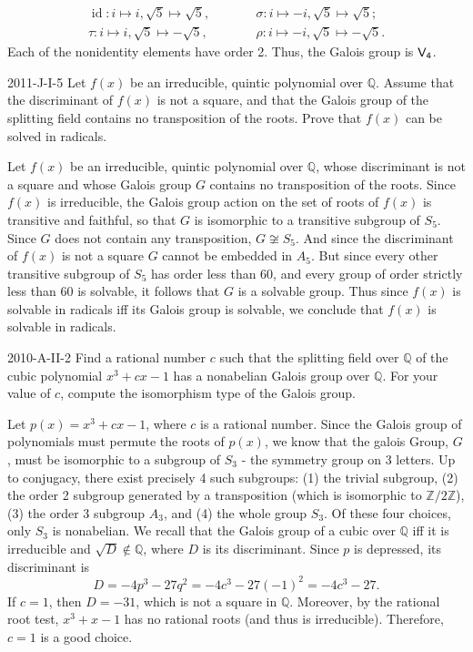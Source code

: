 \documentclass{article}
\begin{document}
	\begin{equation*}
		\begin{matrix}
			\operatorname{id}: i \mapsto i, \sqrt{5} \mapsto \sqrt{5},  & \qquad & \sigma: i \mapsto -i, \sqrt{5} \mapsto \sqrt{5}; \\
			\tau: i \mapsto i, \sqrt{5} \mapsto -\sqrt{5}, & \qquad & \rho:i \mapsto -i, \sqrt{5} \mapsto -\sqrt{5}.
		\end{matrix}
	\end{equation*}
	Each of the nonidentity elements have order 2. Thus, the Galois group is $\sf{V}_{4}$.
	
	\begin{prb}{2011-J-I-5}
		Let $f(x)$ be an irreducible, quintic polynomial over $\mathbb{Q}$. Assume that the discriminant of $f(x)$ is not a square, and that the Galois group of the splitting field contains no transposition of the roots. Prove that $f(x)$ can be solved in radicals. 
	\end{prb}
	Let $f(x)$ be an irreducible, quintic polynomial over $\mathbb{Q}$, whose discriminant is not a square and whose Galois group $G$ contains no transposition of the roots. Since $f(x)$ is irreducible, the Galois group action on the set of roots of $f(x)$ is transitive and faithful, so that $G$ is isomorphic to a transitive subgroup of $S_{5}$. Since $G$ does not contain any transposition, $G \not \cong S_{5}$. And since the discriminant of $f(x)$ is not a square $G$ cannot be embedded in $A_{5}$. But since every other transitive subgroup of $S_5$ has order less than 60, and every group of order strictly less than 60 is solvable, it follows that $G$ is a solvable group. Thus since $f(x)$ is solvable in radicals iff its Galois group is solvable, we conclude that $f(x)$ is solvable in radicals. 
	
	
	\begin{prb}{2010-A-II-2}
		Find a rational number $c$ such that the splitting field over $\mathbb{Q}$ of the cubic polynomial $x^{3} + cx -1$ has a nonabelian Galois group over $\mathbb{Q}$. For your value of $c$, compute the isomorphism type of the Galois group. 
	\end{prb}
	Let $p(x) = x^{3} + cx -1$, where $c$ is a rational number. Since the Galois group of polynomials must permute the roots of $p(x)$, we know that the galois Group, $G$, must be isomorphic to a subgroup of $S_{3}$ - the symmetry group on 3 letters. Up to conjugacy, there exist precisely 4 such subgroups: (1) the trivial subgroup, (2) the order 2 subgroup generated by a transposition (which is isomorphic to $\mathbb{Z}/2\mathbb{Z}$), (3) the order 3 subgroup $A_{3}$, and (4) the whole group $S_{3}$. Of these four choices, only $S_{3}$ is nonabelian. We recall that the Galois group of a cubic over $\mathbb{Q}$ iff it is irreducible and $\sqrt{D} \notin \mathbb{Q}$, where $D$ is its discriminant. Since $p$ is depressed, its discriminant is 
	\begin{equation*}
		D = -4p^{3} - 27q^{2} = -4c^{3} - 27(-1)^{2} = -4c^{3} - 27. 
	\end{equation*}
	If $c = 1$, then $D = -31$, which is not a square in $\mathbb{Q}$. Moreover, by the rational root test, $x^{3} + x - 1$ has no rational roots (and thus is irreducible). Therefore, $c = 1$ is a good choice. 
	
\end{document}
